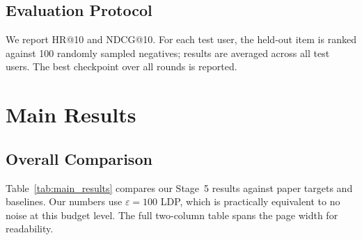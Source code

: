 \documentclass[10pt,twocolumn]{article}
\begin{document}
\subsection{Evaluation Protocol}

We report HR@10 and NDCG@10. For each test user, the held-out item is
ranked against 100 randomly sampled negatives; results are averaged
across all test users. The best checkpoint over all rounds is reported.

\section{Main Results}
\label{sec:results}

\subsection{Overall Comparison}

Table~\ref{tab:main_results} compares our Stage~5 results against paper
targets and baselines. Our numbers use $\varepsilon{=}100$ LDP, which is
practically equivalent to no noise at this budget level. The full
two-column table spans the page width for readability.
\end{document}
